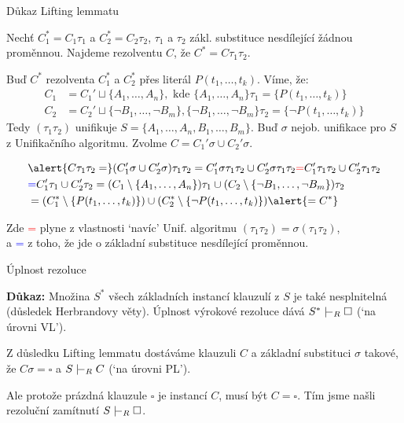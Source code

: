 \documentclass{beamer}
\begin{document}
\begin{frame}{Důkaz Lifting lemmatu}

    Nechť \alert{$C^*_1=C_1\tau_1$} a \alert{$C^*_2=C_2\tau_2$}, $\tau_1$ a $\tau_2$ zákl. substituce nesdílející žádnou proměnnou. Najdeme rezolventu $C$, že \alert{$C^*=C\tau_1\tau_2$}.

    Buď $C^*$ rezolventa $C_1^*$ a $C_2^*$ přes literál $P(t_1,\dots,t_k)$. Víme, že:
    \begin{align*}
        C_1&=C_1' \sqcup \{A_1,\dots,A_n\},\text{ kde }\{A_1,\dots,A_n\}\tau_1=\{P(t_1,\dots,t_k)\}\\
        C_2&=C_2' \sqcup \{\neg B_1,\dots,\neg B_m\},\{\neg B_1,\dots,\neg B_m\}\tau_2=\{\neg P(t_1,\dots,t_k)\}
    \end{align*}
    Tedy $(\tau_1\tau_2)$ unifikuje $S=\{A_1,\dots,A_n,B_1,\dots,B_m\}$. Buď $\sigma$ nejob. unifikace pro $S$ z Unifikačního algoritmu. Zvolme \alert{$C=C_1'\sigma \cup C_2'\sigma$}.

    \vspace{-24pt}
    
    \begin{align*}
        &\alert{C\tau_1\tau_2
        =} (C_1'\sigma \cup C_2'\sigma)\tau_1\tau_2
        =C_1'\sigma\tau_1\tau_2 \cup C_2'\sigma\tau_1\tau_2
        \textcolor{red}{=}C_1'\tau_1\tau_2 \cup C_2'\tau_1\tau_2\\ &
        \textcolor{blue}{=}C_1'\tau_1 \cup C_2'\tau_2
        =(C_1\setminus\{A_1,\dots,A_n\})\tau_1\cup (C_2\setminus\{\neg B_1,\dots,\neg B_m\})\tau_2\\
        &=(C_1^*\setminus\{P(t_1,\dots,t_k)\})\cup(C_2^*\setminus \{\neg P(t_1,\dots,t_k)\})\alert{=C^*}
    \end{align*}
    
    Zde \textcolor{red}{=} plyne z vlastnosti `navíc' Unif. algoritmu $(\tau_1\tau_2)=\sigma(\tau_1\tau_2)$, \\a \textcolor{blue}{=} z 
    toho, že jde o základní substituce nesdílející proměnnou.\hfill\qedsymbol    

\end{frame}


\begin{frame}{Úplnost rezoluce}


    \medskip

    \textbf{Důkaz:}
    Množina $S^*$ všech základních instancí klauzulí z $S$ je také nesplnitelná (důsledek Herbrandovy věty). Úplnost \alert{výrokové} rezoluce dává $S^*\proves_R\square$ (`na úrovni VL'). 
    
    Z důsledku Lifting lemmatu dostáváme klauzuli $C$ a základní substituci $\sigma$ takové, že $C\sigma=\square$ a $S\proves_R C$ (`na úrovni PL'). 
    
    Ale protože prázdná klauzule $\square$ je instancí $C$, musí být $C=\square$. Tím jsme našli rezoluční zamítnutí $S\proves_R \square$.        
    \hfill\qedsymbol

\end{frame}
\end{document}
